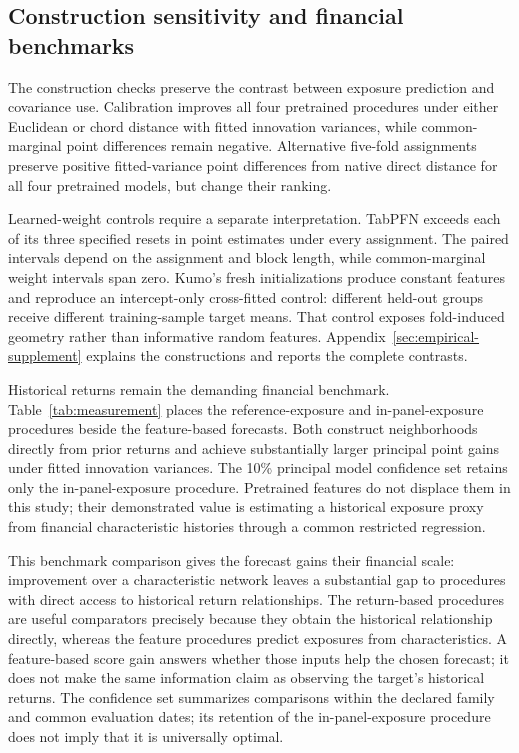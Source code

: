 \documentclass[11pt]{article}
\begin{document}
\subsection{Construction sensitivity and financial benchmarks}
The construction checks preserve the contrast between exposure prediction and
covariance use. Calibration improves all four pretrained procedures under either
Euclidean or chord distance with fitted innovation variances, while
common-marginal point differences remain negative. Alternative five-fold
assignments preserve positive fitted-variance point differences from native
direct distance for all four pretrained models, but change their ranking.

Learned-weight controls require a separate interpretation. TabPFN exceeds each
of its three specified resets in point estimates under every assignment.
The paired intervals depend on the assignment and block length, while
common-marginal
weight intervals span zero. Kumo's fresh initializations produce constant
features and reproduce an intercept-only cross-fitted control: different
held-out groups receive different training-sample target means. That control
exposes fold-induced geometry rather than informative random features.
Appendix~\ref{sec:empirical-supplement} explains the constructions and reports
the complete contrasts.

Historical returns remain the demanding financial benchmark.
Table~\ref{tab:measurement}
places the reference-exposure and in-panel-exposure procedures beside the
feature-based forecasts. Both construct neighborhoods directly from prior
returns and achieve substantially larger principal point gains under fitted
innovation variances. The 10\% principal model
confidence set retains only the in-panel-exposure procedure.
Pretrained features do not displace
them in this study; their demonstrated value is estimating a historical
exposure proxy from financial characteristic histories through a common
restricted regression.

This benchmark comparison gives the forecast gains their financial
scale: improvement over a characteristic network leaves a
substantial gap to procedures with direct access to historical return
relationships. The return-based procedures are useful comparators precisely
because they obtain the historical relationship directly, whereas the feature
procedures predict exposures from characteristics. A feature-based score gain
answers whether those inputs help the chosen forecast; it does not make the
same information claim as observing the target's historical returns.
The confidence set summarizes comparisons within the declared
family and common evaluation dates; its retention of the in-panel-exposure
procedure does not imply that it is universally optimal.
\end{document}
